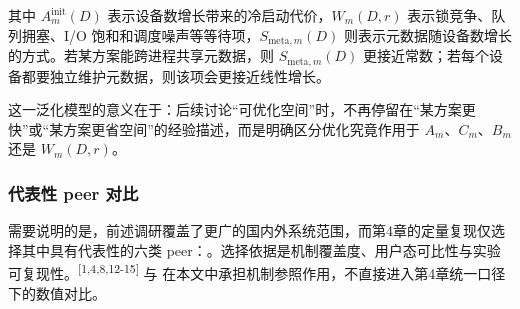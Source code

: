 其中 \(A^{\text{init}}_m(D)\) 表示设备数增长带来的冷启动代价，\(W_m(D,r)\) 表示锁竞争、队列拥塞、I/O 饱和和调度噪声等等待项，\(S_{\text{meta},m}(D)\) 则表示元数据随设备数增长的方式。若某方案能跨进程共享元数据，则 \(S_{\text{meta},m}(D)\) 更接近常数；若每个设备都要独立维护元数据，则该项会更接近线性增长。

这一泛化模型的意义在于：后续讨论``可优化空间''时，不再停留在``某方案更快''或``某方案更省空间''的经验描述，而是明确区分优化究竟作用于 \(A_m\)、\(C_m\)、\(B_m\) 还是 \(W_m(D,r)\)。

\subsubsection{代表性 peer 对比}\label{ux4ee3ux8868ux6027-peer-ux5bf9ux6bd4}

需要说明的是，前述调研覆盖了更广的国内外系统范围，而第4章的定量复现仅选择其中具有代表性的六类 peer：。选择依据是机制覆盖度、用户态可比性与实验可复现性。\textsuperscript{[1,4,8,12-15]}  与  在本文中承担机制参照作用，不直接进入第4章统一口径下的数值对比。

